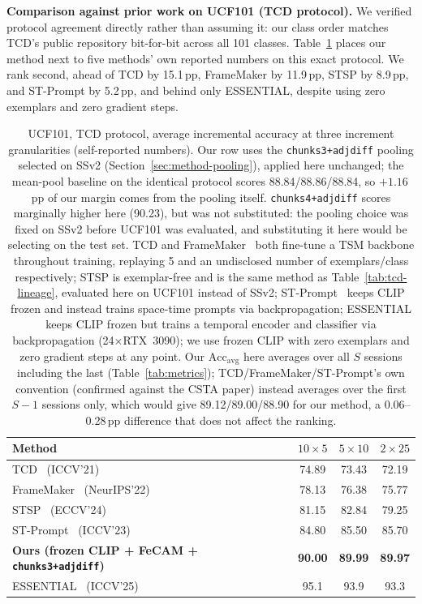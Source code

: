 \documentclass[a4paper,fleqn]{cas-dc}
\begin{document}
\textbf{Comparison against prior work on UCF101 (TCD protocol).} We verified
protocol agreement directly rather than assuming it: our class order matches
TCD's public repository bit-for-bit across all 101 classes.
Table~\ref{tab:ucf101-compare} places our method next to five methods' own
reported numbers on this exact protocol. We rank second, ahead of TCD by
15.1\,pp, FrameMaker by 11.9\,pp, STSP by 8.9\,pp, and ST-Prompt by
5.2\,pp, and behind only ESSENTIAL, despite using zero exemplars and zero
gradient steps.

\begin{table}[pos=!t]
\centering
\caption{UCF101, TCD protocol, average incremental accuracy at three
increment granularities (self-reported numbers). Our row uses the
\texttt{chunks3+adjdiff} pooling selected on SSv2
(Section~\ref{sec:method-pooling}), applied here unchanged; the mean-pool
baseline on the identical protocol scores 88.84/88.86/88.84, so
$+1.16$\,pp of our margin comes from the pooling itself.
\texttt{chunks4+adjdiff} scores marginally higher here (90.23), but was
not substituted: the pooling choice was fixed on SSv2 before UCF101 was
evaluated, and substituting it here would be selecting on the test set.
TCD and FrameMaker~\cite{pei2022framemaker} both fine-tune a TSM backbone
throughout training, replaying 5 and an undisclosed number of
exemplars/class respectively; STSP is exemplar-free and is the same method
as Table~\ref{tab:tcd-lineage}, evaluated here on UCF101 instead of SSv2;
ST-Prompt~\cite{pei2023stprompt} keeps CLIP frozen and instead trains
space-time prompts via backpropagation; ESSENTIAL keeps CLIP frozen but
trains a temporal encoder and classifier via backpropagation
(24$\times$RTX~3090); we use frozen CLIP with zero exemplars and zero
gradient steps at any point. Our $\mathrm{Acc}_{\mathrm{avg}}$ here
averages over all $S$ sessions including the last (Table~\ref{tab:metrics});
TCD/FrameMaker/ST-Prompt's own convention (confirmed against the CSTA
paper) instead averages over the first $S{-}1$ sessions only, which would
give 89.12/89.00/88.90 for our method, a 0.06--0.28\,pp difference that
does not affect the ranking.}
\label{tab:ucf101-compare}
\small
\begin{tabular}{@{}lccc@{}}
\toprule
Method & $10\times5$ & $5\times10$ & $2\times25$ \\
\midrule
TCD~\cite{park2021tcd} (ICCV'21) & 74.89 & 73.43 & 72.19 \\
FrameMaker~\cite{pei2022framemaker} (NeurIPS'22) & 78.13 & 76.38 & 75.77 \\
STSP~\cite{cheng2024stsp} (ECCV'24) & 81.15 & 82.84 & 79.25 \\
ST-Prompt~\cite{pei2023stprompt} (ICCV'23) & 84.80 & 85.50 & 85.70 \\
\textbf{Ours (frozen CLIP + FeCAM + \texttt{chunks3+adjdiff})} & \textbf{90.00} & \textbf{89.99} & \textbf{89.97} \\
ESSENTIAL~\cite{lee2025essential} (ICCV'25) & 95.1 & 93.9 & 93.3 \\
\bottomrule
\end{tabular}
\end{table}
\end{document}
